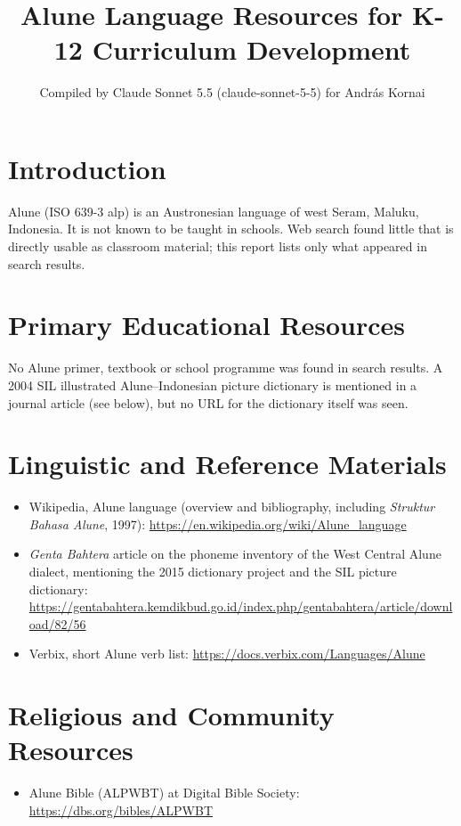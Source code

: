 \documentclass[12pt]{article}
\title{Alune Language Resources for K-12 Curriculum Development}
\author{Compiled by Claude Sonnet 5.5 (claude-sonnet-5-5) for Andr\'as Kornai}
\date{}
\begin{document}
\maketitle

\section{Introduction}
Alune (ISO 639-3 alp) is an Austronesian language of west Seram, Maluku, Indonesia. It is not known to be taught in schools. Web search found little that is directly usable as classroom material; this report lists only what appeared in search results.

\section{Primary Educational Resources}
No Alune primer, textbook or school programme was found in search results. A 2004 SIL illustrated Alune--Indonesian picture dictionary is mentioned in a journal article (see below), but no URL for the dictionary itself was seen.

\section{Linguistic and Reference Materials}
\begin{itemize}
\item Wikipedia, Alune language (overview and bibliography, including \emph{Struktur Bahasa Alune}, 1997): \url{https://en.wikipedia.org/wiki/Alune_language}
\item \emph{Genta Bahtera} article on the phoneme inventory of the West Central Alune dialect, mentioning the 2015 dictionary project and the SIL picture dictionary: \url{https://gentabahtera.kemdikbud.go.id/index.php/gentabahtera/article/download/82/56}
\item Verbix, short Alune verb list: \url{https://docs.verbix.com/Languages/Alune}
\end{itemize}

\section{Religious and Community Resources}
\begin{itemize}
\item Alune Bible (ALPWBT) at Digital Bible Society: \url{https://dbs.org/bibles/ALPWBT}
\end{itemize}
\end{document}
